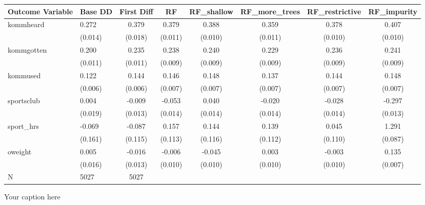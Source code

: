 \begin{adjustbox}{angle=90}
\begin{tabular}{llcccccc}
\hline
Outcome Variable & Base DD & First Diff & RF & RF_shallow & RF_more_trees & RF_restrictive & RF_impurity \\
\hline
kommheard & 0.272 & 0.379 & 0.379 & 0.388 & 0.359 & 0.378 & 0.407 \\
  & (0.014) & (0.018) & (0.011) & (0.010) & (0.011) & (0.010) & (0.010) \\
kommgotten & 0.200 & 0.235 & 0.238 & 0.240 & 0.229 & 0.236 & 0.241 \\
  & (0.011) & (0.011) & (0.009) & (0.009) & (0.009) & (0.009) & (0.009) \\
kommused & 0.122 & 0.144 & 0.146 & 0.148 & 0.137 & 0.144 & 0.148 \\
  & (0.006) & (0.006) & (0.007) & (0.007) & (0.007) & (0.007) & (0.007) \\
sportsclub & 0.004 & -0.009 & -0.053 & 0.040 & -0.020 & -0.028 & -0.297 \\
  & (0.019) & (0.013) & (0.014) & (0.014) & (0.014) & (0.014) & (0.013) \\
sport_hrs & -0.069 & -0.087 & 0.157 & 0.144 & 0.139 & 0.045 & 1.291 \\
  & (0.161) & (0.115) & (0.113) & (0.116) & (0.112) & (0.110) & (0.087) \\
oweight & 0.005 & -0.016 & -0.006 & -0.045 & 0.003 & -0.003 & 0.135 \\
  & (0.016) & (0.013) & (0.010) & (0.010) & (0.010) & (0.010) & (0.007) \\
\hline
N & 5027 & 5027  &  &  &  &  \\
\hline
\end{tabular}
\caption{Your caption here}
\label{tab:your_label}
\end{adjustbox}
